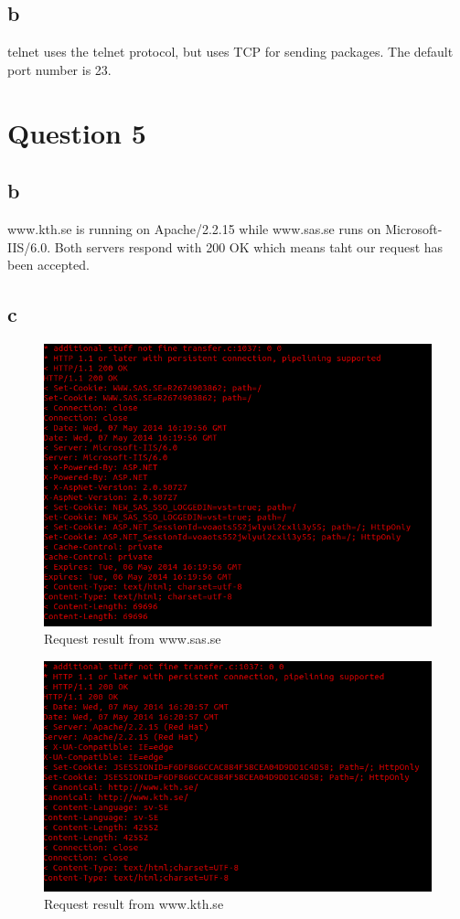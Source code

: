 \documentclass[oneside,a4paper,10pt]{report}
\begin{document}
\subsection{b}
telnet uses the telnet protocol, but uses TCP for sending packages.
The default port number is 23.

\section{Question 5}
\subsection{b}
www.kth.se is running on Apache/2.2.15 while www.sas.se runs on Microsoft-IIS/6.0.
Both servers respond with 200 OK which means taht our request has been accepted.
\newpage

\subsection{c}
\begin{figure}[h!]
  \caption{Request result from www.sas.se}
  \centering
    \includegraphics[scale=0.5]{sas}
\end{figure}



\begin{figure}[h!]
  \caption{Request result from www.kth.se}
  \centering
    \includegraphics[scale=0.5]{kth.png}
\end{figure}
\end{document}
